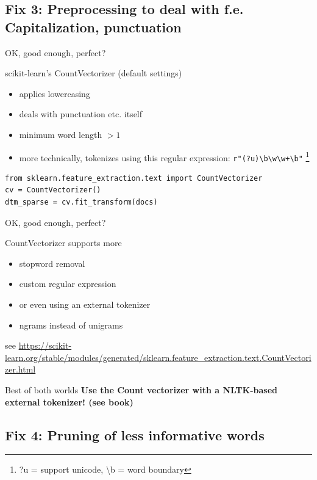 \documentclass[compress]{beamer}
\begin{document}
\subsection{Fix 3: Preprocessing to deal with f.e. Capitalization, punctuation}

\begin{frame}[fragile]{OK, good enough, perfect?}
\begin{block}{scikit-learn's CountVectorizer (default settings)}
\begin{itemize}
	\item applies lowercasing
	\item deals with punctuation etc. itself
	\item minimum word length $>1$
	\item more technically, tokenizes using this regular expression: \texttt{r"(?u)\textbackslash b\textbackslash w\textbackslash w+\textbackslash b"} \footnote{?u = support unicode, \textbackslash b = word boundary}
\end{itemize}
\end{block}
\begin{lstlisting}
from sklearn.feature_extraction.text import CountVectorizer
cv = CountVectorizer()
dtm_sparse = cv.fit_transform(docs)
\end{lstlisting}
\end{frame}


\begin{frame}{OK, good enough, perfect?}
\begin{block}{CountVectorizer supports more}
\begin{itemize}
\item stopword removal
\item custom regular expression
\item or even using an external tokenizer
\item ngrams instead of unigrams
\end{itemize}
\end{block}
\tiny{see \url{https://scikit-learn.org/stable/modules/generated/sklearn.feature\_extraction.text.CountVectorizer.html}}

\pause
\begin{alertblock}{Best of both worlds}
\textbf{Use the Count vectorizer with a NLTK-based external tokenizer! (see book)}
\end{alertblock}
\end{frame}


\subsection{Fix 4: Pruning of less informative words}
\end{document}

